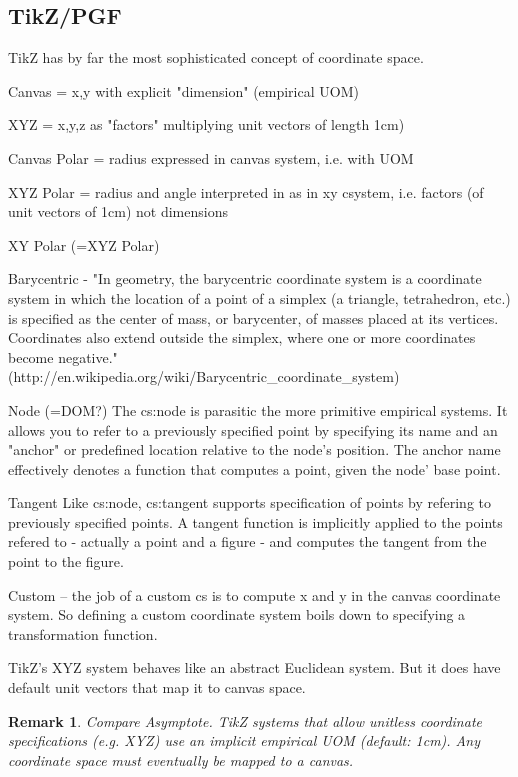 \documentclass[reqno,12pt]{tufte-handout}
\numberwithin{equation}{subsection}
\numberwithin{equation}{subsection}
\newtheorem{remark}{Remark}
\newcommand\cspace{coordinate space}
\begin{document}
\begin{appendices}
\subsection{TikZ/PGF}
\label{subsec:tikz}

TikZ has by far the most sophisticated concept of coordinate space.

Canvas =  x,y with explicit "dimension" (empirical UOM)

XYZ    =  x,y,z as "factors" multiplying unit vectors of length 1cm)

Canvas Polar = radius expressed in canvas system, i.e. with UOM

XYZ Polar  = radius and angle interpreted in as in xy csystem, i.e. factors (of unit vectors of 1cm) not dimensions

XY Polar (=XYZ Polar)

Barycentric  -  "In geometry, the barycentric coordinate system is a coordinate system in which the location of a point of a simplex (a triangle, tetrahedron, etc.) is specified as the center of mass, or barycenter, of masses placed at its vertices. Coordinates also extend outside the simplex, where one or more coordinates become negative."   (http://en.wikipedia.org/wiki/Barycentric\_coordinate\_system)

Node (=DOM?)  The cs:node is parasitic the more primitive empirical
systems.  It allows you to refer to a previously specified point by
specifying its name and an "anchor" or predefined location relative to
the node's position.  The anchor name effectively denotes a function
that computes a point, given the node' base point.

Tangent Like cs:node, cs:tangent supports specification of points by
refering to previously specified points.  A tangent function is
implicitly applied to the points refered to - actually a point and a
figure - and computes the tangent from the point to the figure.

Custom -- the job of a custom cs is to compute x and y in the canvas
coordinate system.  So defining a custom coordinate system boils down
to specifying a transformation function.

TikZ's XYZ system behaves like an abstract Euclidean system.  But it
does have default unit vectors that map it to canvas space.

\begin{remark}
Compare Asymptote.  TikZ systems that allow unitless coordinate
specifications (e.g. XYZ) use an implicit empirical UOM (default:
1cm).  Any \cspace{} must eventually be mapped to a canvas.
\end{remark}


\end{appendices}
\end{document}
